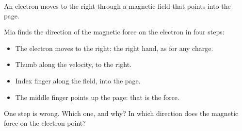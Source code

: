 An electron moves to the right through a magnetic field that points into the page.

\begin{center}
\end{center}

Mia finds the direction of the magnetic force on the electron in four steps:
\begin{itemize}
\item[1.] The electron moves to the right: the right hand, as for any charge.
\item[2.] Thumb along the velocity, to the right.
\item[3.] Index finger along the field, into the page.
\item[4.] The middle finger points up the page: that is the force.
\end{itemize}

\begin{abcliste}
\abc One step is wrong. Which one, and why?
\abc In which direction does the magnetic force on the electron point?
\end{abcliste}
